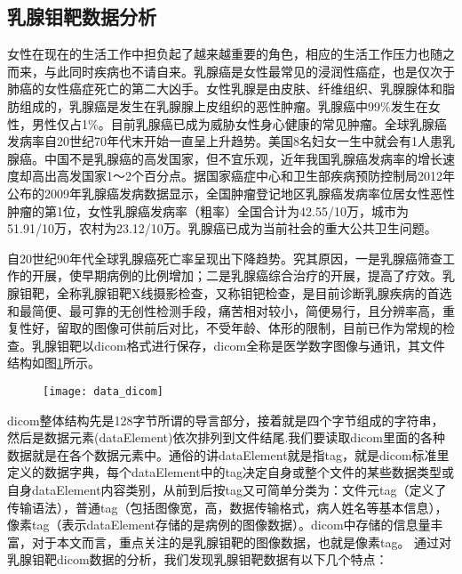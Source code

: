 \subsection{乳腺钼靶数据分析}
女性在现在的生活工作中担负起了越来越重要的角色，相应的生活工作压力也随之而来，与此同时疾病也不请自来。乳腺癌是女性最常见的浸润性癌症，也是仅次于肺癌的女性癌症死亡的第二大凶手。女性乳腺是由皮肤、纤维组织、乳腺腺体和脂肪组成的，乳腺癌是发生在乳腺腺上皮组织的恶性肿瘤。乳腺癌中99\%发生在女性，男性仅占1\%。目前乳腺癌已成为威胁女性身心健康的常见肿瘤。全球乳腺癌发病率自20世纪70年代末开始一直呈上升趋势。美国8名妇女一生中就会有1人患乳腺癌。中国不是乳腺癌的高发国家，但不宜乐观，近年我国乳腺癌发病率的增长速度却高出高发国家1～2个百分点。据国家癌症中心和卫生部疾病预防控制局2012年公布的2009年乳腺癌发病数据显示，全国肿瘤登记地区乳腺癌发病率位居女性恶性肿瘤的第1位，女性乳腺癌发病率（粗率）全国合计为42.55/10万，城市为51.91/10万，农村为23.12/10万。乳腺癌已成为当前社会的重大公共卫生问题。

自20世纪90年代全球乳腺癌死亡率呈现出下降趋势。究其原因，一是乳腺癌筛查工作的开展，使早期病例的比例增加；二是乳腺癌综合治疗的开展，提高了疗效。乳腺钼靶，全称乳腺钼靶X线摄影检查，又称钼钯检查，是目前诊断乳腺疾病的首选和最简便、最可靠的无创性检测手段，痛苦相对较小，简便易行，且分辨率高，重复性好，留取的图像可供前后对比，不受年龄、体形的限制，目前已作为常规的检查。乳腺钼靶以dicom格式进行保存，dicom全称是医学数字图像与通讯，其文件结构如图\ref{fig:data_dicom}所示。
	\begin{figure}[!htbp]
    \centering
    \texttt{[image: data\_dicom]}
    \label{fig:data_dicom}
	\end{figure}
dicom整体结构先是128字节所谓的导言部分，接着就是四个字节组成的字符串，然后是数据元素(dataElement)依次排列到文件结尾.我们要读取dicom里面的各种数据就是在各个数据元素中。通俗的讲dataElement就是指tag，就是dicom标准里定义的数据字典，每个dataElement中的tag决定自身或整个文件的某些数据类型或自身dataElement内容类别，从前到后按tag又可简单分类为：文件元tag（定义了传输语法），普通tag（包括图像宽，高，数据传输格式，病人姓名等基本信息），像素tag（表示dataElement存储的是病例的图像数据）。dicom中存储的信息量丰富，对于本文而言，重点关注的是乳腺钼靶的图像数据，也就是像素tag。
通过对乳腺钼靶dicom数据的分析，我们发现乳腺钼靶数据有以下几个特点：

